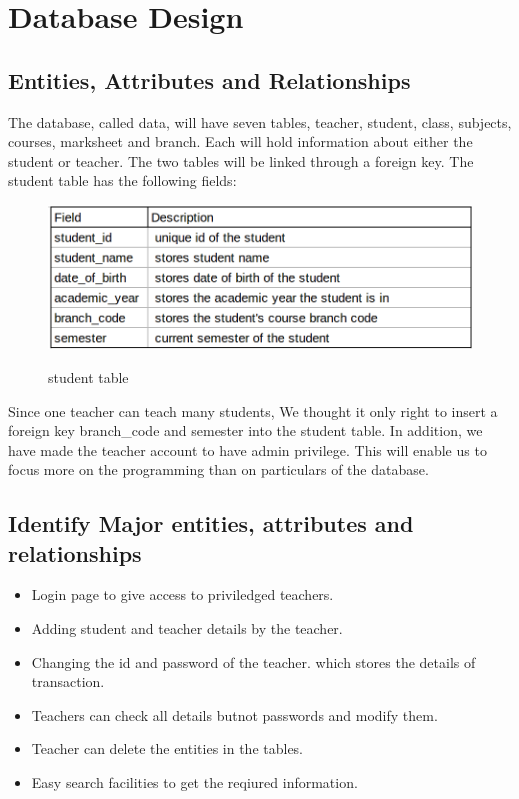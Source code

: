 \chapter{Database Design}

\section{Entities, Attributes and Relationships}
The database, called data, will have seven tables, teacher, student, class, subjects, courses, marksheet and branch. Each will hold information about either the student or teacher. The two
tables will be linked through a foreign key. The student table has the following fields:\\
\begin{figure}[H]
\centering
\caption{student table}
\includegraphics[scale=.5]{./StudentTable.png}
\\[0.2in]
\end{figure}
Since one teacher can teach many students, We thought it only right to insert a foreign key
branch\_code and semester into the student table. In addition, we have made the teacher account to have admin privilege. This will
enable us to focus more on the programming than on particulars of the database.\\
\pagebreak

\section{Identify Major entities, attributes and relationships}
\begin{itemize}
\item Login page to give access to priviledged teachers.
\item Adding student and teacher details by the teacher.
\item Changing the id and password of the teacher.
which stores the details of transaction.
\item Teachers can check all details butnot passwords and modify them.
\item Teacher can delete the entities in the tables.
\item Easy  search facilities to get the reqiured information.
\end{itemize}



